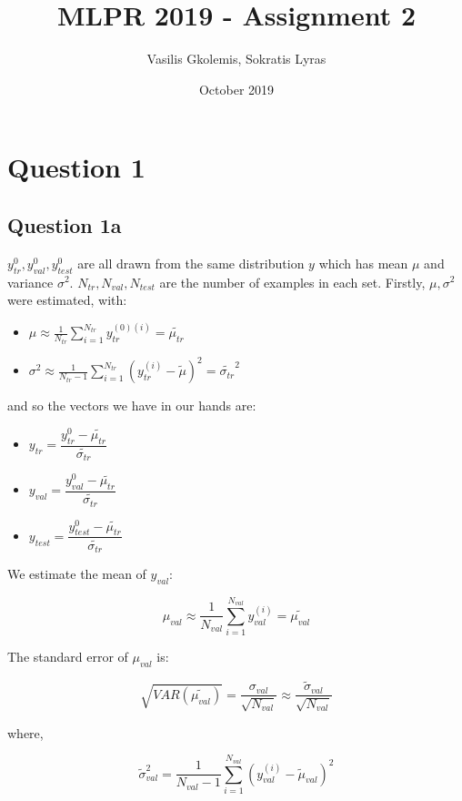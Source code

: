 \documentclass{article}
\title{MLPR 2019 - Assignment 2}
\author{Vasilis Gkolemis, Sokratis Lyras}
\date{October 2019}
\begin{document}
\maketitle

\section*{Question 1}
\subsection*{Question 1a}

$y_{tr}^{0}, y_{val}^{0}, y_{test}^{0}$ are all drawn from the same distribution $y$ which has mean $\mu$ and variance $\sigma^2$. $N_{tr}, N_{val}, N_{test}$ are the number of examples in each set.
Firstly, $\mu, \sigma^2$ were estimated, with:
\begin{itemize}
    \item $\displaystyle \mu \approx \frac{1}{N_{tr}} \sum_{i=1}^{N_{tr}} y_{tr}^{(0)(i)} = \tilde{\mu_{tr}} $
    
    \item $\displaystyle \sigma^2 \approx \frac{1}{N_{tr}-1} \sum_{i=1}^{N_{tr}} (y_{tr}^{(i)} - \tilde{\mu})^2 = \tilde{\sigma_{tr}}^2$
\end{itemize}

and so the vectors we have in our hands are:

\begin{itemize}
    \item $y_{tr} = \dfrac{y_{tr}^{0} - \tilde{\mu_{tr}}}{\tilde{\sigma_{tr}}}$ 
    \item $y_{val} = \dfrac{y_{val}^{0} - \tilde{\mu_{tr}}}{\tilde{\sigma_{tr}}}$ 
    \item $y_{test} = \dfrac{y_{test}^{0} - \tilde{\mu_{tr}}}{\tilde{\sigma_{tr}}}$ 
\end{itemize}

We estimate the mean of $y_{val}$:

$$ \displaystyle \mu_{val} \approx \frac{1}{N_{val}} \sum_{i=1}^{N_{val}} y_{val}^{(i)} = \tilde{\mu_{val}} $$

The standard error of $\mu_{val}$ is:

$$ \sqrt{VAR(\tilde{\mu_{val}})} = 
\displaystyle \frac{\sigma_{val}}{\sqrt{N_{val}}} 
\approx \displaystyle \frac{\tilde{\sigma}_{val}}{\sqrt{N_{val}}}$$ 

where,

$$ \displaystyle \tilde{\sigma}_{val}^2 = \frac{1}{N_{val}-1} \sum_{i=1}^{N_{val}} (y_{val}^{(i)} - \tilde{\mu}_{val})^2 $$
\end{document}
